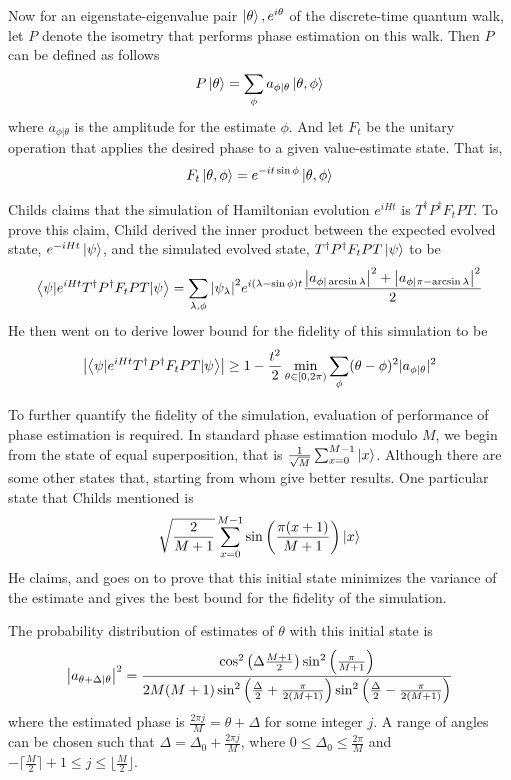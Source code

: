 \documentclass[
10pt, %
a4paper, %
oneside, %
headinclude,footinclude, %
BCOR5mm, %
]{scrartcl}
\begin{document}
Now for an eigenstate-eigenvalue pair $\ket\theta,e^{i\theta}$ of the discrete-time quantum walk, let $P$ denote the isometry that performs phase estimation on this walk. Then $P$ can be defined as follows
$$P\ket\theta=\sum_\phi a_{\phi|\theta}\ket{\theta,\phi}$$\label{P_def}
where $a_{\phi|\theta}$ is the amplitude for the estimate $\phi$. And let $F_t$ be the unitary operation that applies the desired phase to a given value-estimate state. That is,
$$F_t\ket{\theta,\phi}=e^{-it\sin\phi}\ket{\theta,\phi}$$\label{Ft_def}

Childs claims that the simulation of Hamiltonian evolution $e^{iHt}$ is $T^{\dagger}P^{\dagger}F_tPT$. To prove this claim, Child derived the inner product between the expected evolved state, $e^{-iHt}\ket\psi$, and the simulated evolved state, $T^{\dagger}P^{\dagger}F_tPT\ket\psi$ to be
$$\left<\psi|e^{iHt}T^{\dagger}P^{\dagger}F_tPT|\psi\right>=\sum_{\lambda,\phi}\abs{\psi_\lambda}^2e^{i(\lambda-\sin\phi)t}\frac{\abs{a_{\phi|\arcsin\lambda}}^2+\abs{a_{\phi|\pi-\arcsin\lambda}}^2}{2}
$$
He then went on to derive lower bound for the fidelity of this simulation to be
$$\abs{\left<\psi|e^{iHt}T^{\dagger}P^{\dagger}F_tPT|\psi\right>}\geq1 - \frac{t^2}{2}\min_{\theta \in [0, 2\pi)} \sum_\phi (\theta - \phi)^2 |a_{\phi|\theta}|^2$$

To further quantify the fidelity of the simulation, evaluation of performance of phase estimation is required. In standard phase
estimation modulo $M$, we begin from the state of equal superposition, that is $\frac{1}{\sqrt M}\sum_{x=0}^{M-1}\ket x$. Although there are some other states that, starting from whom give better results. One particular state that Childs mentioned is
$$\sqrt{\frac{2}{M+1}}\sum_{x=0}^{M-1}\sin\left(\frac{\pi(x+1)}{M+1}\right)\ket x$$
He claims, and goes on to prove that this initial state minimizes the variance of the estimate and gives the best bound for the fidelity of the simulation.\newline

\label{assumptions}The probability distribution of estimates of $\theta$ with this initial state is
$$\abs{a_{\theta+\Delta|\theta}}^2=\frac{\cos^2\left(\Delta\frac{M+1}{2}\right)\sin^2\left(\frac{\pi}{M+1}\right)}{2M(M+1)\sin^2\left(\frac{\Delta}{2}+\frac{\pi}{2(M+1)}\right)\sin^2\left(\frac{\Delta}{2}-\frac{\pi}{2(M+1)}\right)}$$
where the estimated phase is $\frac{2\pi j}{M}=\theta+\Delta$ for some integer $j$. A range of angles can be chosen such that $\Delta=\Delta_0+\frac{2\pi j}{M}$, where $0\leq\Delta_0\leq\frac{2\pi}{M}$ and $-\lceil \frac{M}{2}\rceil+1\leq j\leq\lfloor\frac{M}{2}\rfloor$.\newline
\end{document}
